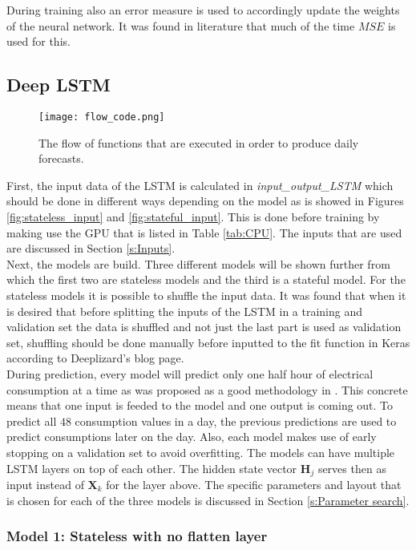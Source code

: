 During training also an error measure is used to accordingly update the weights of the neural network. It was found in literature that much of the time $ MSE $ is used for this.


\subsection{Deep LSTM}\label{s:LSTM_implementation}
\begin{figure}[ht]
	\centering
	\texttt{[image: flow\_code.png]}
	\caption{The flow of functions that are executed in order to produce daily forecasts.}
	\label{fig:model1}
\end{figure}


First, the input data of the LSTM is calculated in \textit{input\_output\_LSTM} which should be done in different ways depending on the model as is showed in Figures \ref{fig:stateless_input} and \ref{fig:stateful_input}. This is done before training by making use the GPU that is listed in Table \ref{tab:CPU}. The inputs that are used are discussed in Section \ref{s:Inputs}. \\ 
Next, the models are build. Three different models will be shown further from which the first two are stateless models and the third is a stateful model. For the stateless models it is possible to shuffle the input data. It was found that when it is desired that before splitting the inputs of the LSTM in a training and validation set the data is shuffled and not just the last part is used as validation set, shuffling should be done manually before inputted to the fit function in Keras according to Deeplizard's blog page.\\
During prediction, every model will predict only one half hour of electrical consumption at a time as was proposed as a good methodology in \cite{ANNRNN}. This concrete means that one input is feeded to the model and one output is coming out. To predict all $ 48 $ consumption values in a day, the previous predictions are used to predict consumptions later on the day. Also, each model makes use of early stopping on a validation set to avoid overfitting. The models can have multiple LSTM layers on top of each other. The hidden state vector $ \bm{H}_{j} $ serves then as input instead of $ \bm{X}_{k} $ for the layer above. The specific parameters and layout that is chosen for each of the three models is discussed in Section \ref{s:Parameter search}.

\subsubsection{Model 1: Stateless with no flatten layer}\label{s:Model1}

